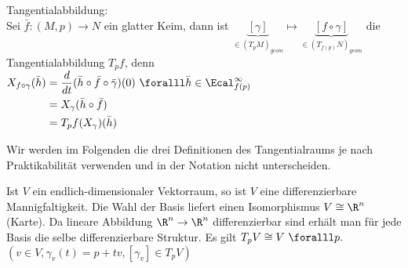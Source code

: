 \begin{rem*}
	Tangentialabbildung:\\
	Sei $ \bar{f} : (M,p) \to N $ ein glatter Keim, dann ist $ \underbrace{[\gamma]}_{\in (T_pM)_{geom}} \mapsto \underbrace{[f \circ \gamma]}_{\in (T_{f(p)} N)_{geom}} $ die Tangentialabbildung $T_pf$, denn $\begin{aligned}[t]
		 X_{f \circ \gamma}(\bar{h}) &= \frac{d}{d t} (\bar{h} \circ \bar{f} \circ \bar{\gamma}) (0)\\
		 &= X_\gamma (\bar{h}\circ\bar{f})\\
		 &= T_pf(X_\gamma)(\bar{h}) 
	\end{aligned} \ \foralll \bar{h} \in \Ecal^\infty_{f(p)} $
\end{rem*}

Wir werden im Folgenden die drei Definitionen des Tangentialraums je nach Praktikabilität verwenden und in der Notation nicht unterscheiden.

\begin{exmp*}
	Ist $V$ ein endlich-dimensionaler Vektorraum, so ist $V$ eine differenzierbare Mannigfaltigkeit. Die Wahl der Basis liefert einen Isomorphismus $ V \cong \R^n $ (Karte). Da lineare Abbildung $\R^n \to \R^n$ differenzierbar sind erhält man für jede Basis die selbe differenzierbare Struktur. Es gilt $ T_pV \cong V \ \foralll p. $ $ (v \in V, \gamma_v(t) = p + tv, [\gamma_v] \in T_pV) $
\end{exmp*}

